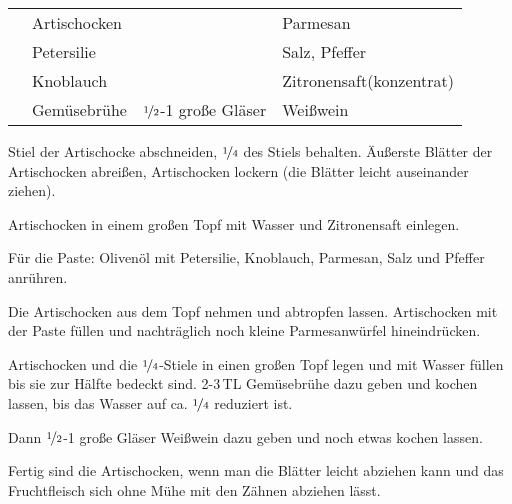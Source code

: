 \begin{centering}

\end{centering}

\begin{table}[H]
  \centering
    
  \begin{tabular*}{1\textwidth}{rlrl}
 & Artischocken & & Parmesan \\
 & Petersilie & & Salz, Pfeffer \\
 & Knoblauch & & Zitronensaft(konzentrat) \\
 & Gemüsebrühe & $\nicefrac{1}{2}$-1 große Gläser & Weißwein \\
  \end{tabular*}
\end{table}

\begin{Notes}
\item Stiel der Artischocke abschneiden, $\nicefrac{1}{4}$ des Stiels behalten. Äußerste Blätter der Artischocken abreißen, Artischocken lockern (die Blätter leicht auseinander ziehen).
\item Artischocken in einem großen Topf mit Wasser und Zitronensaft einlegen.
\item Für die Paste: Olivenöl mit Petersilie, Knoblauch, Parmesan, Salz und Pfeffer anrühren.
\item Die Artischocken aus dem Topf nehmen und abtropfen lassen. Artischocken mit der Paste füllen und nachträglich noch kleine Parmesanwürfel hineindrücken.
\item Artischocken und die $\nicefrac{1}{4}$-Stiele in einen großen Topf legen und mit Wasser füllen bis sie zur Hälfte bedeckt sind. 2-3\,TL Gemüsebrühe dazu geben und kochen lassen, bis das Wasser auf ca. $\nicefrac{1}{4}$ reduziert ist.
\item Dann $\nicefrac{1}{2}$-1 große Gläser Weißwein dazu geben und noch etwas kochen lassen.
\item Fertig sind die Artischocken, wenn man die Blätter leicht abziehen kann und das Fruchtfleisch sich ohne Mühe mit den Zähnen abziehen lässt.
\end{Notes}


